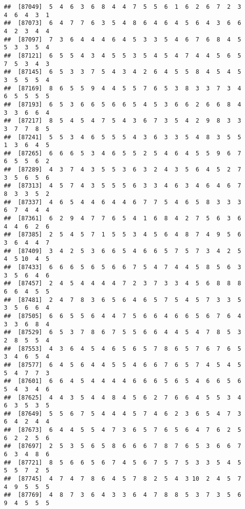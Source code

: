 \documentclass[
]{book}
\begin{document}
\begin{verbatim}
##  [87049]  5  4  6  3  6  8  4  4  7  5  5  6  1  6  2  6  7  2  3  4  6  4  3  1
##  [87073]  6  4  7  7  6  3  5  4  8  6  4  6  4  5  6  4  3  6  6  4  2  3  4  4
##  [87097]  7  3  6  4  4  4  6  4  5  3  3  5  4  6  7  6  8  4  5  5  3  3  5  4
##  [87121]  6  5  5  4  3  4  5  5  3  5  4  5  4  7  4  4  5  6  5  7  5  3  4  3
##  [87145]  6  5  3  3  7  5  4  3  4  2  6  4  5  5  8  4  5  4  5  3  5  5  5  4
##  [87169]  8  6  5  5  9  4  4  5  5  7  6  5  3  8  3  3  7  3  4  6  5  5  5  5
##  [87193]  6  5  3  6  6  5  6  6  5  4  5  3  6  6  2  6  6  8  4  3  3  6  6  4
##  [87217]  8  5  4  5  4  7  5  4  3  6  7  3  5  4  2  9  8  3  3  3  7  7  8  5
##  [87241]  5  5  3  4  6  5  5  5  4  3  6  3  3  5  4  8  3  5  5  1  3  6  4  5
##  [87265]  6  6  6  5  3  4  6  5  5  2  5  4  6  4  5  5  9  6  7  6  5  5  6  2
##  [87289]  4  3  7  4  3  5  5  3  6  3  2  4  3  5  6  4  5  2  7  3  5  6  5  6
##  [87313]  4  5  7  4  3  5  5  5  6  3  3  4  6  3  4  6  4  6  7  8  3  3  5  2
##  [87337]  4  6  5  4  4  6  4  4  6  7  7  5  4  6  5  8  3  3  3  6  7  4  4  4
##  [87361]  6  2  9  4  7  7  6  5  4  1  6  8  4  2  7  5  6  3  6  4  4  6  2  6
##  [87385]  2  5  4  5  7  1  5  5  3  4  5  6  4  8  7  4  9  5  6  3  6  4  4  7
##  [87409]  3  4  2  5  3  6  6  5  4  6  6  5  7  5  7  3  4  2  5  4  5 10  4  5
##  [87433]  6  6  6  5  6  5  6  6  7  5  4  7  4  4  5  8  5  6  3  3  5  6  4  6
##  [87457]  2  4  5  4  4  4  4  7  2  3  7  3  3  4  5  6  8  8  8  6  6  4  5  5
##  [87481]  2  4  7  8  3  6  5  6  4  6  5  7  5  4  5  7  3  3  5  3  5  6  6  4
##  [87505]  6  6  5  5  6  4  4  7  5  6  6  4  6  6  5  6  7  6  4  3  3  6  8  4
##  [87529]  6  5  3  7  8  6  7  5  5  6  6  4  4  5  4  7  8  5  3  2  8  5  5  4
##  [87553]  4  3  6  4  5  4  6  5  6  5  7  8  6  5  7  6  7  6  5  3  4  6  5  4
##  [87577]  6  4  5  6  4  4  5  5  4  6  6  7  6  5  7  4  5  4  5  5  4  7  7  3
##  [87601]  6  6  4  5  4  4  4  4  6  6  6  5  6  5  4  6  6  5  6  5  4  3  4  6
##  [87625]  4  4  3  5  4  4  8  4  5  6  2  7  6  6  4  5  5  3  4  6  3  5  3  5
##  [87649]  5  5  6  7  5  4  4  4  5  7  4  6  2  3  6  5  4  7  3  6  4  2  4  4
##  [87673]  6  4  4  5  5  4  7  3  6  5  7  6  5  6  4  7  6  2  5  6  2  2  5  6
##  [87697]  2  5  3  5  6  5  8  6  6  6  7  8  7  6  5  3  6  6  7  6  3  4  8  6
##  [87721]  8  5  6  6  5  6  7  4  5  6  7  5  7  5  3  3  5  4  5  5  5  7  2  5
##  [87745]  4  7  4  7  8  6  4  5  7  8  2  5  4  3 10  2  4  5  7  4  9  5  5  5
##  [87769]  4  8  7  3  6  4  3  3  6  4  7  8  8  5  3  7  3  5  6  9  4  5  5  5

\end{verbatim}
\end{document}
